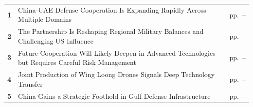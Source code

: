 \documentclass[10pt,a4paper]{article}
\begin{document}
\begin{tabularx}{\linewidth}{p{8mm}Yp{29mm}}
\textcolor{BOBlue}{\bfseries 1} & China-UAE Defense Cooperation Is Expanding Rapidly Across Multiple Domains & {\color{BOMuted}pp.~\pageref{chap:1}--\pageref{chap:1:end}} \\[3pt]
\textcolor{BOBlue}{\bfseries 2} & The Partnership Is Reshaping Regional Military Balances and Challenging US Influence & {\color{BOMuted}pp.~\pageref{chap:2}--\pageref{chap:2:end}} \\[3pt]
\textcolor{BOBlue}{\bfseries 3} & Future Cooperation Will Likely Deepen in Advanced Technologies but Requires Careful Risk Management & {\color{BOMuted}pp.~\pageref{chap:3}--\pageref{chap:3:end}} \\[3pt]
\textcolor{BOBlue}{\bfseries 4} & Joint Production of Wing Loong Drones Signals Deep Technology Transfer & {\color{BOMuted}pp.~\pageref{chap:4}--\pageref{chap:4:end}} \\[3pt]
\textcolor{BOBlue}{\bfseries 5} & China Gains a Strategic Foothold in Gulf Defense Infrastructure & {\color{BOMuted}pp.~\pageref{chap:5}--\pageref{chap:5:end}} \\[3pt]
\end{tabularx}
\clearpage
\end{document}
